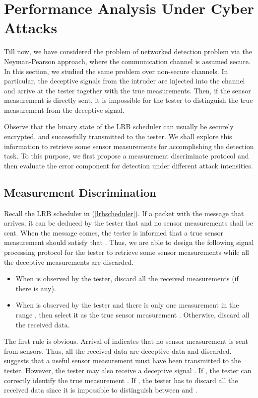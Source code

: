 \documentclass[journal]{IEEEtran}
\begin{document}
\section{Performance Analysis Under Cyber Attacks}
\label{section4}
Till now, we have considered the problem of networked detection problem via the Neyman-Pearson approach, where the communication channel is assumed secure. In this section, we studied the same problem over non-secure channels. In particular, the deceptive signals from the intruder are injected into the channel and arrive at the tester together with the true measurements. Then, if the sensor measurement  is directly sent, it is impossible for the tester to distinguish the true measurement from the deceptive signal.

Observe that the binary state    of the LRB scheduler can usually be securely encrypted, and successfully transmitted to the tester. We shall explore this information to retrieve some sensor measurements for accomplishing the detection task. To this purpose, we first propose a measurement discriminate protocol and then evaluate the error component for detection under different attack intensities.



\subsection{Measurement Discrimination}
Recall the LRB scheduler in (\ref{lrbscheduler}). If a packet with the message that  arrives,  it can be deduced by the tester that  and no sensor measurements shall be sent. When the message  comes, the tester is informed that a true sensor measurement should satisfy that . Thus, we are able to design the following signal processing protocol for the tester to retrieve some sensor measurements while all the deceptive measurements are discarded.

\begin{itemize}
\item When  is observed by the tester, discard all the received measurements (if there is any).
\item When   is observed by the tester and there is only one measurement  in the range , then select it as the true sensor measurement . Otherwise, discard all the received data.
\end{itemize}

The first rule is obvious. Arrival of   indicates that no sensor measurement is sent from sensors. Thus, all the received data are deceptive data and discarded.  suggests that a useful sensor measurement  must have been transmitted to the tester. However, the tester may also receive a deceptive signal . If , the tester can correctly identify the true measurement . If ,  the tester has to discard all the received data since it is impossible to distinguish between  and .
\end{document}
